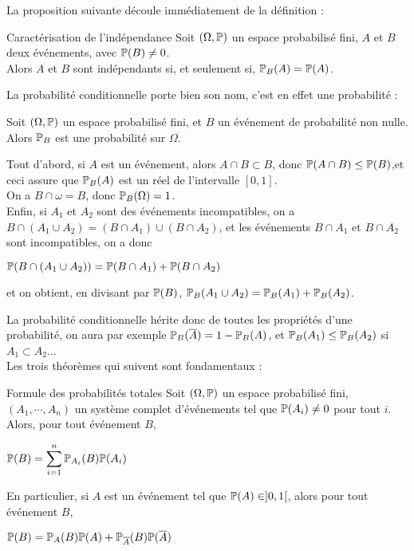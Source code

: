 \documentclass[12pt,a4paper]{report}
\begin{document}
La proposition suivante découle immédiatement de la définition :

\begin{proposition}{Caractérisation de l'indépendance}{}
Soit $(\Omega,\mathbb{P})$ un espace probabilisé fini, $A$ et $B$ deux événements, avec $\mathbb{P}(B) \ne 0$. \\
Alors $A$ et $B$ sont indépendants si, et seulement si, $\mathbb{P}_B(A) = \mathbb{P}(A)$.
\end{proposition}

La probabilité conditionnelle porte bien son nom, c'est en effet une probabilité :

\begin{proposition}{}{}
Soit $(\Omega,\mathbb{P})$ un espace probabilisé fini, et $B$ un événement de probabilité non nulle. Alors $\mathbb{P}_B$ est une probabilité sur $\Omega$.
\end{proposition}

\begin{demo}{}
Tout d'abord, si $A$ est un événement, alors $A \cap B \subset B$, donc $\mathbb{P}(A \cap B) \le \mathbb{P}(B)$,et ceci assure que $\mathbb{P}_B(A)$ est un réel de l'intervalle $[0,1]$. \\

On a $B \cap \omega = B$, donc $\mathbb{P}_B(\Omega) = 1$. \\
Enfin, si $A_1$ et $A_2$ sont des événements incompatibles, on a $B \cap (A_1 \cup A_2) = (B \cap A_1) \cup (B \cap A_2)$, et les événements $B \cap A_1$ et $B \cap A_2$ sont incompatibles, on a donc
\begin{center}
$\mathbb{P}(B \cap (A_1 \cup A_2)) = \mathbb{P}(B \cap A_1) + \mathbb{P}(B \cap A_2)$
\end{center}
et on obtient, en divisant par $\mathbb{P}(B)$, $\mathbb{P}_B(A_1 \cup A_2) = \mathbb{P}_B(A_1) + \mathbb{P}_B(A_2)$. 

\end{demo}

La probabilité conditionnelle hérite donc de toutes les propriétés d'une probabilité, on aura par exemple $\mathbb{P}_B(\overline{A}) = 1- \mathbb{P}_B(A)$, et $\mathbb{P}_B(A_1) \le \mathbb{P}_B(A_2)$ si $A_1 \subset A_2$... \\

Les trois théorèmes qui suivent sont fondamentaux :

\begin{theoreme}{Formule des probabilités totales}{}
Soit $(\Omega, \mathbb{P})$ un espace probabilisé fini, $(A_1,\cdots,A_n)$ un système complet d'événements tel que $\mathbb{P}(A_i) \ne 0$ pour tout $i$. Alors, pour tout événement $B$,
\begin{center}
$\mathbb{P}(B) = \displaystyle \sum_{i=1}^n \mathbb{P}_{A_i}(B) \mathbb{P}(A_i)$
\end{center}
En particulier, si $A$ est un événement tel que $\mathbb{P}(A) \in ]0,1[$, alors pour tout événement $B$, 
\begin{center}
$\mathbb{P}(B) = \mathbb{P}_A(B)\mathbb{P}(A) + \mathbb{P}_{\overline{A}}(B)\mathbb{P}(\overline{A})$
\end{center}
\end{theoreme}
\end{document}
